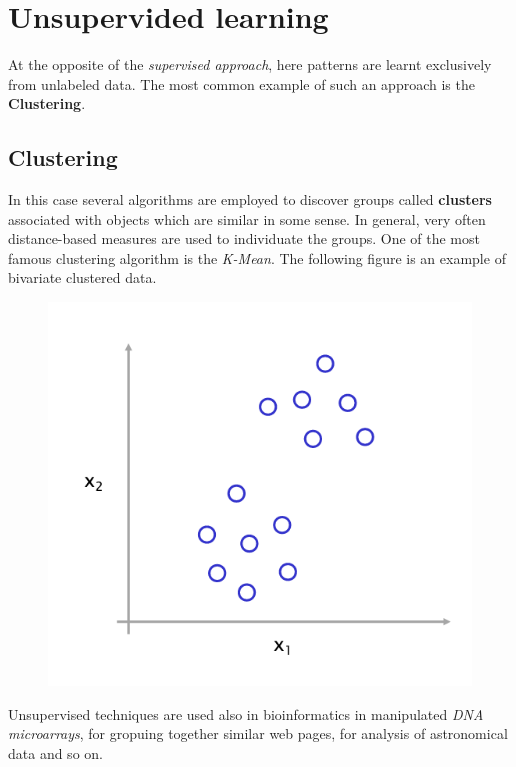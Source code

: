 \section{Unsupervided learning}
At the opposite of the \textit{supervised approach}, here patterns are learnt exclusively from unlabeled data. The most common example of such an approach is the \textbf{Clustering}.

\subsection{Clustering}
In this case several algorithms are employed to discover groups called \textbf{clusters} associated with objects which are similar in some sense. In general, very often distance-based measures are used to individuate the groups. One of the most famous clustering algorithm is the \textit{K-Mean}. The following figure is an example of bivariate clustered data. 

\begin{figure}[h]
    \centering
    \includegraphics[scale=0.5]{img/clustering.png}
\end{figure}

Unsupervised techniques are used also in bioinformatics in manipulated \textit{DNA microarrays}, for gropuing together similar web pages, for analysis of astronomical data and so on.